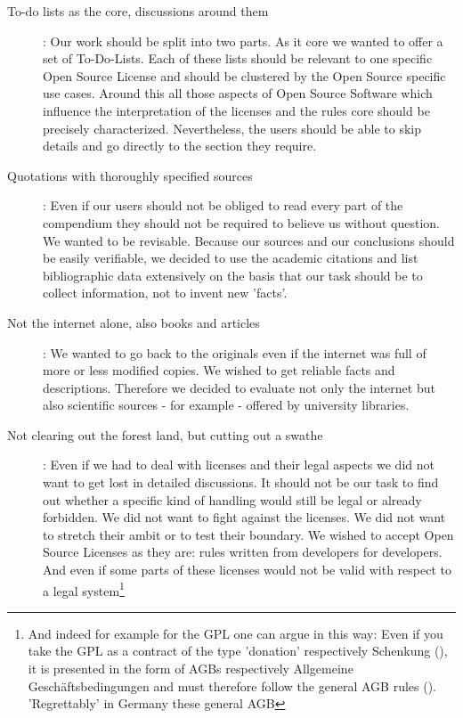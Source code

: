 \begin{description}
  \item[To-do lists as the core, discussions around them]: Our work should be
  split into two parts. As it core we wanted to offer a
  set of To-Do-Lists. Each of these lists should be relevant to one specific
  Open Source License and should be clustered by the Open Source specific use
  cases. Around this all those aspects of Open Source Software which influence the
  interpretation of the licenses and the rules core should be precisely
  characterized. Nevertheless, the users should be able to skip
  details and go directly to the section they require.
  \item[Quotations with thoroughly specified sources]: Even if our users should
  not be obliged to read every part of the compendium they should not be
  required to believe us without question. We wanted to be revisable. Because
  our sources and our conclusions should be easily verifiable, we decided to use
  the academic citations and list bibliographic data extensively on the basis
  that our task should be to collect information, not to invent new 'facts'.
  \item[Not the internet alone, also books and articles]: We wanted to go back
  to the originals even if the internet was full of more or less modified
  copies. We wished to get reliable facts and descriptions. Therefore we decided
  to evaluate not only the internet but also scientific sources - for example -
  offered by university libraries.
  \item[Not clearing out the forest land, but cutting out a swathe]: Even if we
  had to deal with licenses and their legal aspects we did not want to get lost
  in detailed discussions. It should not be our task to find out
  whether a specific kind of handling would still be legal or already forbidden.
  We did not want to fight against the licenses. We did not want to stretch
  their ambit or to test their boundary. We wished to accept Open Source Licenses
  as they are: rules written from developers for developers. And even if
  some parts of these licenses would not be valid with respect to a legal
  system\footnote{And indeed for example for the GPL one can argue in this way:
  Even if you take the GPL as a contract of the type 'donation' respectively
  \glqq{}Schenkung\grqq{} (\cite[cf. thereto][128]{Oberhem2008a}), it is
  presented in the form of AGBs respectively \glqq{}Allgemeine
  Geschäftsbedingungen\grqq{} and must therefore follow the general AGB rules
  (\cite[cf.][133ff]{Oberhem2008a}). 'Regrettably' in Germany these general AGB
}
\end{description}
